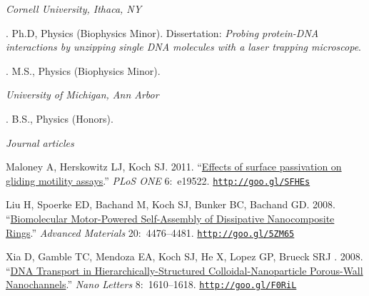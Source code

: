 \documentclass[11pt]{article}
\begin{document}
\bigskip



\noindent\emph{Cornell University, Ithaca, NY \vspace{0.01in}}

. Ph.D, Physics (Biophysics Minor). Dissertation: \emph{Probing protein-DNA interactions by unzipping single DNA molecules with a laser trapping microscope}. %



. M.S., Physics (Biophysics Minor). 


\medskip
\noindent\emph{University of Michigan, Ann Arbor\vspace{0.02in}}

. B.S., Physics (Honors). \vspace{0.01in}

\bigskip
 
\medskip
\noindent\emph{Journal articles \vspace{0.05in}}
 

\ind Maloney A, Herskowitz LJ, Koch SJ. 2011. ``\href{http://goo.gl/SFHEs}{Effects of surface passivation on gliding motility assays}.'' \emph{PLoS ONE} 6:~e19522. {\scriptsize  \texttt{\href{http://goo.gl/SFHEs}{http://goo.gl/SFHEs}}}


\ind Liu H, Spoerke ED, Bachand M, Koch SJ, Bunker BC, Bachand GD. 2008. ``\href{http://goo.gl/5ZM65}{Biomolecular Motor-Powered Self-Assembly of Dissipative Nanocomposite Rings}.'' \emph{Advanced Materials} 20:~4476--4481. {\scriptsize  \texttt{\href{http://goo.gl/5ZM65}{http://goo.gl/5ZM65}}}


\ind Xia D, Gamble TC, Mendoza EA, Koch SJ, He X, Lopez GP, Brueck SRJ . 2008. ``\href{http://goo.gl/F0RiL}{DNA Transport in Hierarchically-Structured Colloidal-Nanoparticle Porous-Wall Nanochannels}.''
 \emph{Nano Letters} 8:~1610--1618. {\scriptsize  \texttt{\href{http://goo.gl/F0RiL}{http://goo.gl/F0RiL}}}
\end{document}
